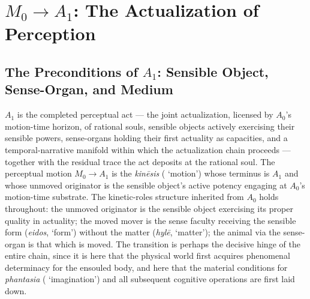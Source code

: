\section{$M_0 \rightarrow A_1$: The Actualization of Perception}

\subsection{The Preconditions of $A_1$: Sensible Object, Sense-Organ, and Medium}

$A_1$ is the completed perceptual act --- the joint actualization, licensed by $A_0$'s motion-time horizon, of rational souls, sensible objects actively exercising their sensible powers, sense-organs holding their first actuality as capacities, and a temporal-narrative manifold within which the actualization chain proceeds --- together with the residual trace the act deposits at the rational soul. The perceptual motion $M_0 \rightarrow A_1$ is the \textit{kinēsis} ( `motion') whose terminus is $A_1$ and whose unmoved originator is the sensible object's active potency engaging at $A_0$'s motion-time substrate. The kinetic-roles structure inherited from $A_0$ holds throughout: the unmoved originator is the sensible object exercising its proper quality in actuality; the moved mover is the sense faculty receiving the sensible form (\textit{eidos},  `form') without the matter (\textit{hylē},  `matter'); the animal via the sense-organ is that which is moved. The transition is perhaps the decisive hinge of the entire chain, since it is here that the physical world first acquires phenomenal determinacy for the ensouled body, and here that the material conditions for \textit{phantasia} ( `imagination') and all subsequent cognitive operations are first laid down.

